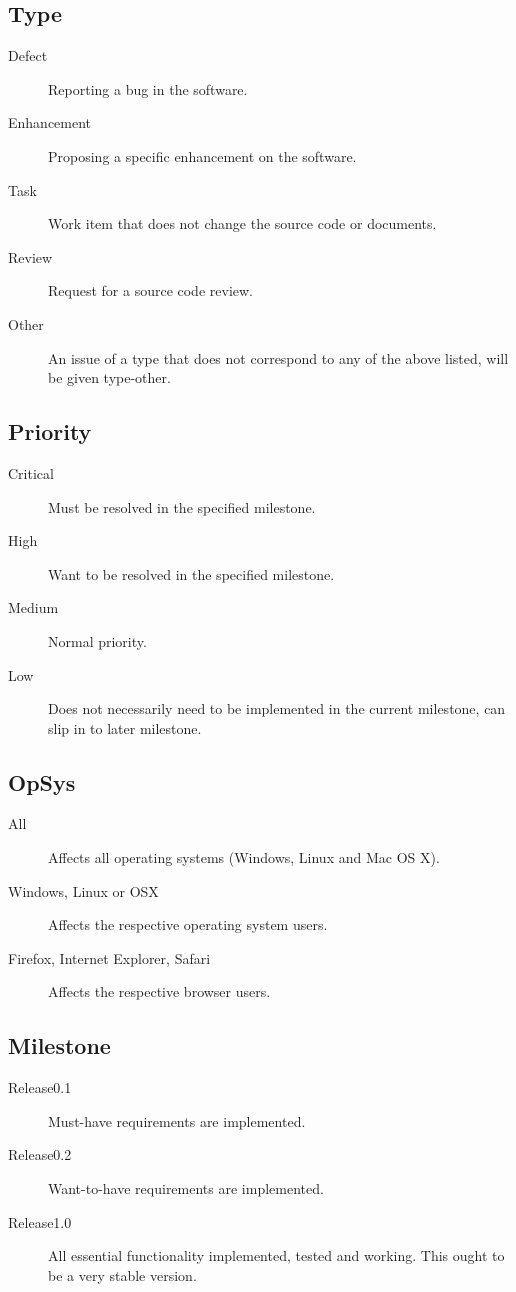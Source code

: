 \subsection{Type}
\begin{description}
\item[Defect]
Reporting a bug in the software.
\item[Enhancement]
Proposing a specific enhancement on the software.
\item[Task]
Work item that does not change the source code or documents.
\item[Review]
Request for a source code review.
\item[Other]
An issue of a type that does not correspond to any of the above listed, will be given type-other.
\end{description}
\subsection{Priority}
\begin{description}
\item[Critical]
Must be resolved in the specified milestone.
\item[High]
Want to be resolved in the specified milestone.
\item[Medium]
Normal priority.
\item[Low]
Does not necessarily need to be implemented in the current milestone, can slip in to later milestone.
\end{description}
\subsection{OpSys}
\begin{description}
\item[All]
Affects all operating systems (Windows, Linux and Mac OS X).
\item[Windows, Linux or OSX]
Affects the respective operating system users.
\item[Firefox, Internet Explorer, Safari]
Affects the respective browser users.
\end{description}
\subsection{Milestone}
\begin{description}
\item[Release0.1]
Must-have requirements are implemented.
\item[Release0.2]
Want-to-have requirements are implemented.
\item[Release1.0]
All essential functionality implemented, tested and working. This ought to be a very stable version.
\end{description}
